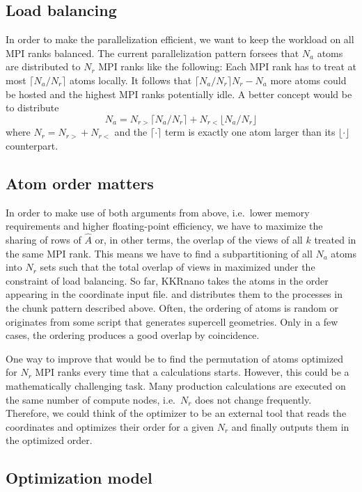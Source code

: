 \documentclass[a4paper]{article}
\newcommand{\MPIrank}{MPI rank} %
\begin{document}
\subsection{Load balancing}

In order to make the parallelization efficient,
we want to keep the workload on all \MPIrank{}s balanced.
The current parallelization pattern forsees that $N_a$ atoms
are distributed to $N_r$ \MPIrank{}s like the following:
Each \MPIrank{} has to treat at most $\lceil N_a/N_r \rceil$ atoms locally.
It follows that $\lceil N_a/N_r \rceil N_r - N_a$ more atoms could be
hosted and the highest \MPIrank{}s potentially idle.
A better concept would be to distribute
$$ N_a = N_{r>} \lceil N_a/N_r \rceil + N_{r<} \lfloor N_a/N_r \rfloor $$
where $N_r = N_{r>} + N_{r<}$ and 
the $\lceil \cdot \rceil$ term is exactly one atom larger than its $\lfloor \cdot \rfloor$ counterpart.

\subsection{Atom order matters}

In order to make use of both arguments from above,
i.e.~lower memory requirements and higher floating-point efficiency,
we have to maximize the sharing of rows of $\hat A$
or, in other terms, the overlap of the views of all $k$ treated in
the same \MPIrank{}.
This means we have to find a subpartitioning of all $N_a$ atoms into
$N_r$ sets such that the total overlap of views in maximized
under the constraint of load balancing.
So far, KKRnano takes the atoms in the order appearing in the coordinate input file.
and distributes them to the processes in the chunk pattern described above.
Often, the ordering of atoms is random or originates from some script that generates
supercell geometries. 
Only in a few cases, the ordering produces a good overlap by coincidence.

One way to improve that would be to find the permutation of atoms optimized for $N_r$ \MPIrank{}s
every time that a calculations starts. However, this could be a mathematically challenging task.
Many production calculations are executed on the same number of compute nodes, 
i.e.~$N_r$ does not change frequently.
Therefore, we could think of the optimizer to be an external tool that 
reads the coordinates and
optimizes their order for a given $N_r$
and finally outputs them in the optimized order.

\subsection{Optimization model}
\end{document}
